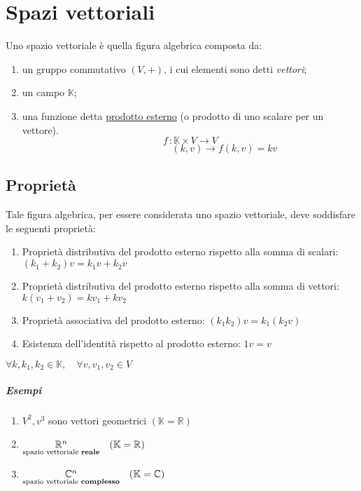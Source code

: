 \chapter{Spazi vettoriali}

	Uno spazio vettoriale è quella figura algebrica composta da:
	\begin{enumerate}
		\item un gruppo commutativo $(V, +)$, i cui elementi sono detti \textit{vettori};
		\item un campo $\mathbb{K}$;
		\item una funzione detta \underline{prodotto esterno} (o prodotto di uno scalare per un vettore).
		$$ f \, : \mathbb{K} \times V \rightarrow V $$
		$$ 	\qquad \qquad \qquad \quad (k, v) \rightarrow f(k, v) = kv $$
	\end{enumerate}
	
	\section{Proprietà}
		Tale figura algebrica, per essere considerata uno spazio vettoriale, deve soddisfare le seguenti proprietà:
		\begin{enumerate}[(1)]
			\item Proprietà distributiva del prodotto esterno rispetto alla somma di scalari: $ (k_1 + k_2 ) v = k_1v + k_2v $
			\item Proprietà distributiva del prodotto esterno rispetto alla somma di vettori: $ k(v_1 + v_2) = kv_1 + kv_2 $
			\item Proprietà associativa del prodotto esterno: $ (k_1 k_2) v = k_1 (k_2v) $
			\item Esistenza dell'identità rispetto al prodotto esterno: $ 1v = v $
		\end{enumerate}
		$ \forall k, k_1, k_2 \in \mathbb{K}, \quad \forall v, v_1, v_2 \in V $

		\paragraph{Esempi}
		\begin{enumerate}[(1)]
			\item $ V^2, v^3 $ sono vettori geometrici $ (\mathbb{K} = \mathbb{R}) $
			\item $ \underset{\text{spazio vettoriale \textbf{reale}}}{\mathbb{R}^n} \quad (\mathbb{K} = \mathbb{R}) $
			\item $ \underset{\text{spazio vettoriale \textbf{complesso}}}{\mathbb{C}^n} \quad (\mathbb{K} = \mathbb{C}) $
		\end{enumerate}

